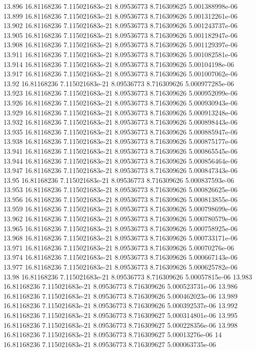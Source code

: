 {13.896 16.81168236 7.115021683e-21 8.09536773 8.716309625 5.001388998e-06
13.899 16.81168236 7.115021683e-21 8.09536773 8.716309626 5.001312261e-06
13.902 16.81168236 7.115021683e-21 8.09536773 8.716309626 5.001243737e-06
13.905 16.81168236 7.115021683e-21 8.09536773 8.716309626 5.001182947e-06
13.908 16.81168236 7.115021683e-21 8.09536773 8.716309626 5.001129397e-06
13.911 16.81168236 7.115021683e-21 8.09536773 8.716309626 5.001082581e-06
13.914 16.81168236 7.115021683e-21 8.09536773 8.716309626 5.00104198e-06
13.917 16.81168236 7.115021683e-21 8.09536773 8.716309626 5.001007062e-06
13.92 16.81168236 7.115021683e-21 8.09536773 8.716309626 5.000977285e-06
13.923 16.81168236 7.115021683e-21 8.09536773 8.716309626 5.000952099e-06
13.926 16.81168236 7.115021683e-21 8.09536773 8.716309626 5.000930943e-06
13.929 16.81168236 7.115021683e-21 8.09536773 8.716309626 5.000913248e-06
13.932 16.81168236 7.115021683e-21 8.09536773 8.716309626 5.000898443e-06
13.935 16.81168236 7.115021683e-21 8.09536773 8.716309626 5.000885947e-06
13.938 16.81168236 7.115021683e-21 8.09536773 8.716309626 5.000875177e-06
13.941 16.81168236 7.115021683e-21 8.09536773 8.716309626 5.000865545e-06
13.944 16.81168236 7.115021683e-21 8.09536773 8.716309626 5.000856464e-06
13.947 16.81168236 7.115021683e-21 8.09536773 8.716309626 5.000847343e-06
13.95 16.81168236 7.115021683e-21 8.09536773 8.716309626 5.000837593e-06
13.953 16.81168236 7.115021683e-21 8.09536773 8.716309626 5.000826625e-06
13.956 16.81168236 7.115021683e-21 8.09536773 8.716309626 5.000813855e-06
13.959 16.81168236 7.115021683e-21 8.09536773 8.716309626 5.000798699e-06
13.962 16.81168236 7.115021683e-21 8.09536773 8.716309626 5.000780579e-06
13.965 16.81168236 7.115021683e-21 8.09536773 8.716309626 5.000758925e-06
13.968 16.81168236 7.115021683e-21 8.09536773 8.716309626 5.000733171e-06
13.971 16.81168236 7.115021683e-21 8.09536773 8.716309626 5.00070276e-06
13.974 16.81168236 7.115021683e-21 8.09536773 8.716309626 5.000667143e-06
13.977 16.81168236 7.115021683e-21 8.09536773 8.716309626 5.000625782e-06
13.98 16.81168236 7.115021683e-21 8.09536773 8.716309626 5.00057815e-06
13.983 16.81168236 7.115021683e-21 8.09536773 8.716309626 5.000523731e-06
13.986 16.81168236 7.115021683e-21 8.09536773 8.716309626 5.000462023e-06
13.989 16.81168236 7.115021683e-21 8.09536773 8.716309626 5.000392537e-06
13.992 16.81168236 7.115021683e-21 8.09536773 8.716309627 5.000314801e-06
13.995 16.81168236 7.115021683e-21 8.09536773 8.716309627 5.000228356e-06
13.998 16.81168236 7.115021683e-21 8.09536773 8.716309627 5.00013276e-06
14 16.81168236 7.115021683e-21 8.09536773 8.716309627 5.000063735e-06
}\coilhistory
{}\coilsweep
